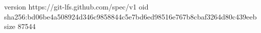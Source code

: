 version https://git-lfs.github.com/spec/v1
oid sha256:bd06be4a508924d346c9858844c5e7bd6ed98516e767b8cbaf3264d80c439eeb
size 87544
